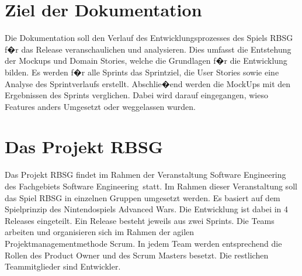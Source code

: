 \documentclass[12pt, titlepage]{scrartcl}
\newcommand{\RN}[1]{%
	\textup{\uppercase\expandafter{\romannumeral#1}}%
}
\begin{document}
	\section{Ziel der Dokumentation}
		Die Dokumentation soll den Verlauf des Entwicklungsprozesses des Spiels RBSG f�r das Release \RN{2} veranschaulichen und analysieren. Dies umfasst die Entstehung der Mockups und Domain Stories, welche die Grundlagen f�r die Entwicklung bilden. Es werden f�r alle Sprints das Sprintziel, die User Stories sowie eine Analyse des Sprintverlaufs erstellt. Abschlie�end werden die MockUps mit den Ergebnissen des Sprints verglichen. Dabei wird darauf eingegangen, wieso Features anders Umgesetzt oder weggelassen wurden.
	\section{Das Projekt RBSG}
			Das Projekt RBSG findet im Rahmen der Veranstaltung Software Engineering \RN{1} des Fachgebiets Software Engineering\ statt. Im Rahmen dieser Veranstaltung soll das Spiel RBSG in einzelnen Gruppen umgesetzt werden. Es basiert auf dem Spielprinzip des Nintendospiels Advanced Wars. Die Entwicklung ist dabei in 4 Releases eingeteilt. Ein Release besteht jeweils aus zwei Sprints. Die Teams arbeiten und organisieren sich im Rahmen der agilen Projektmanagementmethode Scrum. In jedem Team werden entsprechend die Rollen des Product Owner und des Scrum Masters besetzt. Die restlichen Teammitglieder sind Entwickler.
		
\end{document}
